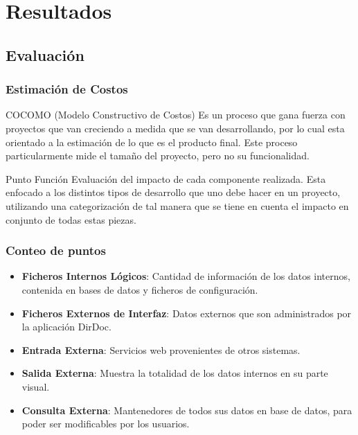 \documentclass{beamer}
\begin{document}

\section{Resultados} 

\subsection{Evaluación}


\begin{frame}
\frametitle{Estimación de Costos}
\begin{block}{COCOMO (Modelo Constructivo de Costos)}
Es un proceso que gana fuerza con proyectos que van creciendo a medida que se van desarrollando, por lo cual esta orientado a la estimación de lo que es el producto final. Este proceso particularmente mide el tamaño del proyecto, pero no su funcionalidad.
\end{block}
\begin{block}{Punto Función}
Evaluación del impacto de cada componente realizada. Esta enfocado a los distintos tipos de desarrollo que uno debe hacer en un proyecto, utilizando una categorización de tal manera que se tiene en cuenta el impacto en conjunto de todas estas piezas.
\end{block}
\end{frame}


\begin{frame}
\frametitle{Conteo de puntos}
\begin{itemize}
\item \textbf{Ficheros Internos Lógicos}: Cantidad de información de los datos internos, contenida en bases de datos y ficheros de configuración.
\item \textbf{Ficheros Externos de Interfaz}: Datos externos que son administrados por la aplicación DirDoc.
\item \textbf{Entrada Externa}: Servicios web provenientes de otros sistemas.
\item \textbf{Salida Externa}: Muestra la totalidad de los datos internos en su parte visual.
\item \textbf{Consulta Externa}: Mantenedores de todos sus datos en base de datos, para poder ser modificables por los usuarios.
\end{itemize}
\end{frame}
\end{document}
